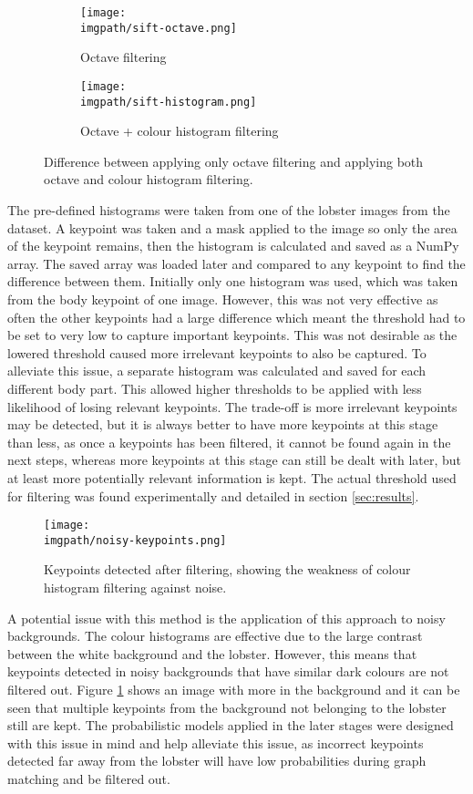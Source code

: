 \begin{figure}[H]
	\begin{subfigure}{0.5\textwidth}
	\texttt{[image: \\imgpath/sift-octave.png]}
	\caption{Octave filtering}
	\end{subfigure}
	\hspace*{\fill}
	\begin{subfigure}{0.5\textwidth}
	\texttt{[image: \\imgpath/sift-histogram.png]}
	\caption{Octave + colour histogram filtering}
	\end{subfigure}
\caption{Difference between applying only octave filtering and applying both octave and colour histogram filtering.}
\end{figure}
\noindent
The pre-defined histograms were taken from one of the lobster images from the dataset. A keypoint was taken and a mask applied to the image so only the area of the keypoint remains, then the histogram is calculated and saved as a NumPy array. The saved array was loaded later and compared to any keypoint to find the difference between them. Initially only one histogram was used, which was taken from the body keypoint of one image. However, this was not very effective as often the other keypoints had a large difference which meant the threshold had to be set to very low to capture important keypoints. This was not desirable as the lowered threshold caused more irrelevant keypoints to also be captured. To alleviate this issue, a separate histogram was calculated and saved for each different body part. This allowed higher thresholds to be applied with less likelihood of losing relevant keypoints. The trade-off is more irrelevant keypoints may be detected, but it is always better to have more keypoints at this stage than less, as once a keypoints has been filtered, it cannot be found again in the next steps, whereas more keypoints at this stage can still be dealt with later, but at least more potentially relevant information is kept. The actual threshold used for filtering was found experimentally and detailed in section \ref{sec:results}.
\begin{figure}[H]
\centering
\texttt{[image: \\imgpath/noisy-keypoints.png]}
\caption{Keypoints detected after filtering, showing the weakness of colour histogram filtering against noise.}
\label{fig:noisy-histogram}
\end{figure}
\noindent
A potential issue with this method is the application of this approach to noisy backgrounds. The colour histograms are effective due to the large contrast between the white background and the lobster. However, this means that keypoints detected in noisy backgrounds that have similar dark colours are not filtered out. Figure \ref{fig:noisy-histogram} shows an image with more in the background and it can be seen that multiple keypoints from the background not belonging to the lobster still are kept. The probabilistic models applied in the later stages were designed with this issue in mind and help alleviate this issue, as incorrect keypoints detected far away from the lobster will have low probabilities during graph matching and be filtered out. 

